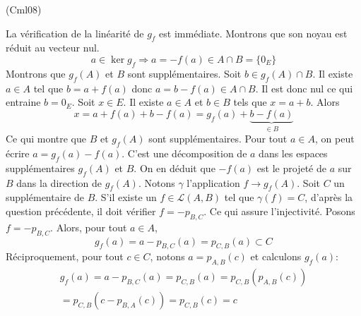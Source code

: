 \begin{tiny}(Cml08)\end{tiny} La vérification de la linéarité de $g_f$ est immédiate. Montrons que son noyau est réduit au vecteur nul.
\begin{displaymath}
 a\in \ker g_f \Rightarrow a = -f(a)\in A \cap B =\{0_E\}
\end{displaymath}
Montrons que $g_f(A)$ et $B$ sont supplémentaires.\newline
Soit  $b\in g_f(A)\cap B$. Il existe $a\in A$ tel que $b=a+f(a)$ donc $a=b-f(a)\in A\cap B$. Il est donc nul ce qui entraine $b=0_E$.\newline
Soit $x\in E$. Il existe $a\in A$ et $b\in B$ tels que $x=a+b$. Alors
\begin{displaymath}
 x = a+f(a) +b-f(a) = g_f(a) +  \underset{\in B}{\underbrace{b-f(a)}}
\end{displaymath}
Ce qui montre que $B$ et $g_f(A)$ sont supplémentaires.\newline
Pour tout $a\in A$, on peut écrire $a = g_f(a) - f(a)$. C'est une décomposition de $a$ dans les espaces supplémentaires $g_f(A)$ et $B$. On en déduit que $-f(a)$ est le projeté de $a$ sur $B$ dans la direction de $g_f(A)$.\newline
Notons $\gamma$ l'application $f\rightarrow g_f(A)$.\newline
Soit $C$ un supplémentaire de $B$.\newline
S'il existe un $f\in \mathcal{L}(A,B)$ tel que $\gamma(f)=C$, d'après la question précédente, il doit vérifier $f = - p_{B,C}$. Ce qui assure l'injectivité.\newline
Posons $f = - p_{B,C}$. Alors, pour tout $a\in A$, 
\begin{displaymath}
g_f(a)= a - p_{B,C}(a) = p_{C,B}(a)\subset C 
\end{displaymath}
Réciproquement, pour tout $c\in C$, notons $a=p_{A,B}(c)$ et calculons $g_f(a)$:
\begin{multline*}
 g_f(a) = a - p_{B,C}(a)=p_{C,B}(a) = p_{C,B}( p_{A,B}(c))\\
= p_{C,B}( c - p_{B,A}(c)) = p_{C,B}( c) = c 
\end{multline*}

